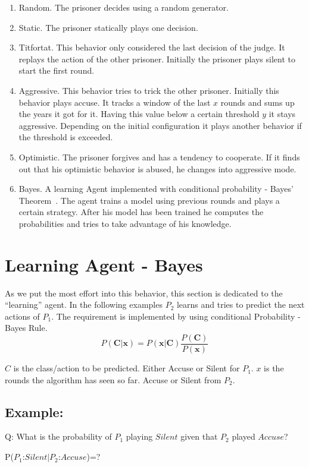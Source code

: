 \documentclass{acm_proc_article-sp}
\begin{document}
\begin{enumerate}
   \item Random. The prisoner decides using a random generator.
   \item Static. The prisoner statically plays one decision.
   \item Titfortat. This behavior only considered the last decision of the judge. It replays
      the action of the other prisoner. Initially the prisoner plays silent to start the first
      round.
   \item Aggressive. This behavior tries to trick the other prisoner. Initially this
      behavior plays accuse. It tracks a window of the last $x$ rounds and sums up
      the years it got for it. Having this value below a certain threshold $y$ it stays aggressive.
      Depending on the initial configuration it plays another behavior if the threshold
      is exceeded.
   \item Optimistic. The prisoner forgives and has a tendency to cooperate. If it finds out
      that his optimistic behavior is abused, he changes into aggressive mode.
   \item Bayes. A learning Agent implemented with conditional probability - Bayes' Theorem~\cite{gupta2011introduction}.
		The agent trains a model using previous rounds and plays a certain strategy. After his model has been trained he computes the probabilities and tries to take advantage of his knowledge.
\end{enumerate}

\section{Learning Agent - Bayes}
As we put the most effort into this behavior, this section is dedicated to the ``learning'' agent.
In the following examples $P_2$ learns and tries to predict the next actions of $P_1$. The requirement is implemented by using conditional Probability - Bayes Rule.
\[
    P(\textbf{C}|\textbf{x}) = P(\textbf{x}|\textbf{C}) \frac{P(\textbf{C})}{P(\textbf{x})}
\]

$C$ is the class/action to be predicted. Either Accuse or Silent for $P_1$.
$x$ is the rounds the algorithm has seen so far. Accuse or Silent from $P_2$.


\subsection{Example:}
Q: What is the probability of $P_1$ playing $Silent$ given that $P_2$ played $Accuse$? 
\begin{center} 
P($P_1$:$Silent$$|$$P_2$:$Accuse$)=?
\end{center}
\end{document}
